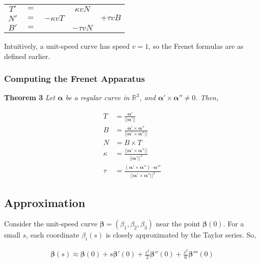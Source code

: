 \documentclass[11pt]{article}
\begin{document}
\begin{center}
    \begin{tabular}{ c c c c c }
        $T'$ & $=$ & & $\kappa vN$ & \\
        $N'$ & $=$ & $-\kappa vT$ & & $+\tau vB$ \\
        $B'$ & $=$ & & $-\tau vN$ &
    \end{tabular}
\end{center}

Intuitively, a unit-speed curve has speed \(v=1\), so the Frenet formulas are as defined earlier.

\subsubsection{Computing the Frenet Apparatus}
\label{sec:org3c07918}
\textbf{Theorem 3} \emph{Let \(\boldsymbol{\alpha}\) be a regular curve in \(\mathbb{R}^{3}\), and \(\boldsymbol{\alpha}' \times \boldsymbol{\alpha}'' \neq 0\). Then,}

\begin{align*}
T &= \frac{\boldsymbol{\alpha}'}{\lvert\lvert \boldsymbol{\alpha}' \lvert\lvert} \\
B &= \frac{\boldsymbol{\alpha}' \times \boldsymbol{\alpha}''}{\lvert\lvert \boldsymbol{\alpha}' \times \boldsymbol{\alpha}''\lvert\lvert} \\
N &= B \times T \\
\kappa &= \frac{\lvert\lvert \boldsymbol{\alpha}' \times \boldsymbol{\alpha}'' \lvert\lvert}{\lvert\lvert \boldsymbol{\alpha}' \lvert\lvert^{3}} \\
\tau &= \frac{\left(\boldsymbol{\alpha}' \times \boldsymbol{\alpha}''\right) \cdot \boldsymbol{\alpha}'''}{\lvert\lvert \boldsymbol{\alpha}' \times \boldsymbol{\alpha}'' \lvert\lvert^{2}}
\end{align*}

\subsection{Approximation}
\label{sec:orgf6e8fcf}
Consider the unit-speed curve \(\boldsymbol{\beta} = \left( \beta_{1}, \beta_{2}, \beta_{3} \right)\) near the point \(\boldsymbol{\beta}\left(0\right)\). For a small \(s\), each coordinate \(\beta_{i}\left(s\right)\) is closely approximated by the Taylor series. So,

\begin{align*}
    \boldsymbol{\beta}\left(s\right) \approx \boldsymbol{\beta}\left(0\right) + s\boldsymbol{\beta}'\left(0\right) + \frac{s^{2}}{2}\boldsymbol{\beta}''\left(0\right) + \frac{s^{3}}{6}\boldsymbol{\beta}'''\left(0\right)
\end{align*}
\end{document}
